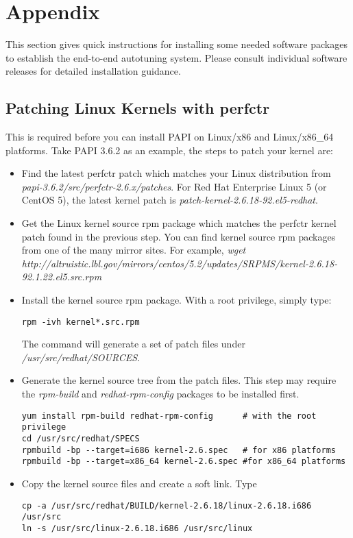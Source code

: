 \clearpage
\section{Appendix}
This section gives quick instructions for installing some needed software packages to establish the end-to-end autotuning system. 
Please consult individual software releases for detailed installation guidance. 

\subsection{Patching Linux Kernels with perfctr}
This is required before you can install PAPI on Linux/x86 and Linux/x86\_64 platforms. 
Take PAPI 3.6.2 as an example, the steps to patch your kernel are:
\begin{itemize}
\item Find the latest perfctr patch which matches your Linux distribution from \textit{papi-3.6.2/src/perfctr-2.6.x/patches}. 
For Red Hat Enterprise Linux 5 (or CentOS 5), the latest kernel patch is \textit{patch-kernel-2.6.18-92.el5-redhat}.
\item Get the Linux kernel source rpm package which matches the perfctr kernel patch found in
the previous step. 
You can find kernel source rpm packages from one of the many mirror sites. For example, 
\textit{wget http://altruistic.lbl.gov/mirrors/centos/5.2/updates/SRPMS/kernel-2.6.18-92.1.22.el5.src.rpm}
\item Install the kernel source rpm package. With a root privilege, simply type: 
\begin{verbatim}
rpm -ivh kernel*.src.rpm
\end{verbatim}
The command will generate a set of patch files under
\textit{/usr/src/redhat/SOURCES}.
\item Generate the kernel source tree from the patch files. 
This step may require the \textit{rpm-build} and \textit{redhat-rpm-config} packages to be installed first. 
\begin{verbatim}
yum install rpm-build redhat-rpm-config      # with the root privilege 
cd /usr/src/redhat/SPECS
rpmbuild -bp --target=i686 kernel-2.6.spec   # for x86 platforms    
rpmbuild -bp --target=x86_64 kernel-2.6.spec #for x86_64 platforms
\end{verbatim}

\item Copy the kernel source files and create a soft link. Type 
\begin{verbatim}
cp -a /usr/src/redhat/BUILD/kernel-2.6.18/linux-2.6.18.i686 /usr/src
ln -s /usr/src/linux-2.6.18.i686 /usr/src/linux
\end{verbatim}


\end{itemize}
